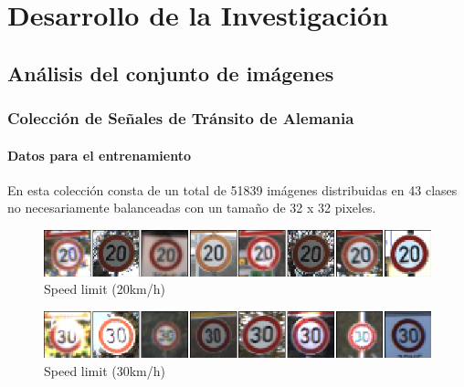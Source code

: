 \chapter{Desarrollo de la Investigación}
\setcounter{page}{47}
\renewcommand{\baselinestretch}{2} %

\section{Análisis del conjunto de imágenes}

\subsection{Colección de Señales de Tránsito de Alemania}

	\subsubsection{Datos para el entrenamiento}

		En esta colección consta de un total de 51839 imágenes distribuidas en 43 clases no necesariamente balanceadas con un tamaño de 32 x 32 pixeles.

		\begin{figure}[H]
			\begin{center}
			\includegraphics[width=1\textwidth]{images/desarrollo/imagenes/1__(1).png}
			\end{center}
			\begin{center}
			\caption{\small{Speed limit (20km/h)}}
			\end{center}
			\vspace{-1.5em}
		\end{figure}

		\begin{figure}[H]
			\begin{center}
			\includegraphics[width=1\textwidth]{images/desarrollo/imagenes/1__(2).png}
			\end{center}
			\begin{center}
			\caption{\small{Speed limit (30km/h)}}
			\end{center}
			\vspace{-1.5em}
		\end{figure}

